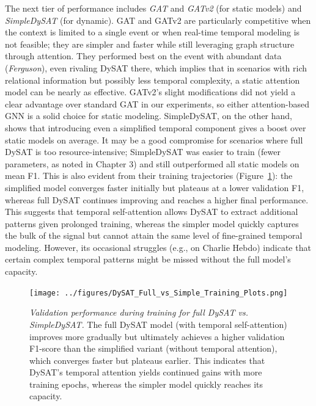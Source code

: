 \documentclass{cshonours}
\begin{document}
The next tier of performance includes \emph{GAT} and \emph{GATv2} (for static models) and \emph{SimpleDySAT} (for dynamic). GAT and GATv2 are particularly competitive when the context is limited to a single event or when real-time temporal modeling is not feasible; they are simpler and faster while still leveraging graph structure through attention. They performed best on the event with abundant data (\emph{Ferguson}), even rivaling DySAT there, which implies that in scenarios with rich relational information but possibly less temporal complexity, a static attention model can be nearly as effective. GATv2's slight modifications did not yield a clear advantage over standard GAT in our experiments, so either attention-based GNN is a solid choice for static modeling. SimpleDySAT, on the other hand, shows that introducing even a simplified temporal component gives a boost over static models on average. It may be a good compromise for scenarios where full DySAT is too resource-intensive; SimpleDySAT was easier to train (fewer parameters, as noted in Chapter 3) and still outperformed all static models on mean F1. This is also evident from their training trajectories (Figure~\ref{fig:dysat_training}): the simplified model converges faster initially but plateaus at a lower validation F1, whereas full DySAT continues improving and reaches a higher final performance. This suggests that temporal self-attention allows DySAT to extract additional patterns given prolonged training, whereas the simpler model quickly captures the bulk of the signal but cannot attain the same level of fine-grained temporal modeling. However, its occasional struggles (e.g., on Charlie Hebdo) indicate that certain complex temporal patterns might be missed without the full model's capacity.



\begin{figure}[htbp]

\centering

\texttt{[image: ../figures/DySAT\_Full\_vs\_Simple\_Training\_Plots.png]}

\caption[DySAT vs. SimpleDySAT training curves]{\textit{Validation performance during training for full DySAT vs. SimpleDySAT.} The full DySAT model (with temporal self-attention) improves more gradually but ultimately achieves a higher validation F1-score than the simplified variant (without temporal attention), which converges faster but plateaus earlier. This indicates that DySAT's temporal attention yields continued gains with more training epochs, whereas the simpler model quickly reaches its capacity.}

\label{fig:dysat_training}

\end{figure}
\end{document}
